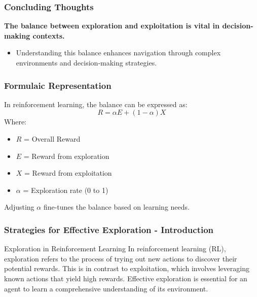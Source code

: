 \documentclass[aspectratio=169]{beamer}
\begin{document}
\begin{frame}[fragile]
    \frametitle{Concluding Thoughts}
    \textbf{The balance between exploration and exploitation is vital in decision-making contexts.} 
    \begin{itemize}
        \item Understanding this balance enhances navigation through complex environments and decision-making strategies.
    \end{itemize}
\end{frame}

\begin{frame}[fragile]
    \frametitle{Formulaic Representation}
    In reinforcement learning, the balance can be expressed as:
    \begin{equation}
        R = \alpha E + (1 - \alpha) X
    \end{equation}
    Where:
    \begin{itemize}
        \item \( R \) = Overall Reward
        \item \( E \) = Reward from exploration
        \item \( X \) = Reward from exploitation
        \item \( \alpha \) = Exploration rate (0 to 1)
    \end{itemize}
    Adjusting \( \alpha \) fine-tunes the balance based on learning needs.
\end{frame}

\begin{frame}[fragile]
    \frametitle{Strategies for Effective Exploration - Introduction}
    \begin{block}{Exploration in Reinforcement Learning}
        In reinforcement learning (RL), exploration refers to the process of trying out new actions to discover their potential rewards. This is in contrast to exploitation, which involves leveraging known actions that yield high rewards. Effective exploration is essential for an agent to learn a comprehensive understanding of its environment.
    \end{block}
\end{frame}
\end{document}
